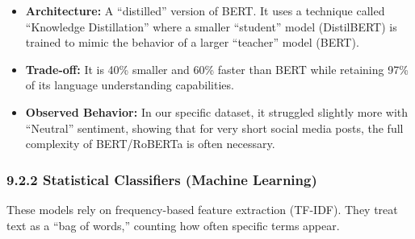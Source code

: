 \documentclass[
]{article}
\providecommand{\tightlist}{%
  \setlength{\itemsep}{0pt}\setlength{\parskip}{0pt}}
\begin{document}
\begin{enumerate}
  \begin{itemize}
  \tightlist
  \item
    \textbf{Architecture:} A ``distilled'' version of BERT. It uses a
    technique called ``Knowledge Distillation'' where a smaller
    ``student'' model (DistilBERT) is trained to mimic the behavior of a
    larger ``teacher'' model (BERT).
  \item
    \textbf{Trade-off:} It is 40\% smaller and 60\% faster than BERT
    while retaining 97\% of its language understanding capabilities.
  \item
    \textbf{Observed Behavior:} In our specific dataset, it struggled
    slightly more with ``Neutral'' sentiment, showing that for very
    short social media posts, the full complexity of BERT/RoBERTa is
    often necessary.
  \end{itemize}
\end{enumerate}

\subsubsection{9.2.2 Statistical Classifiers (Machine
Learning)}\label{statistical-classifiers-machine-learning}

These models rely on frequency-based feature extraction (TF-IDF). They
treat text as a ``bag of words,'' counting how often specific terms
appear.
\end{document}
